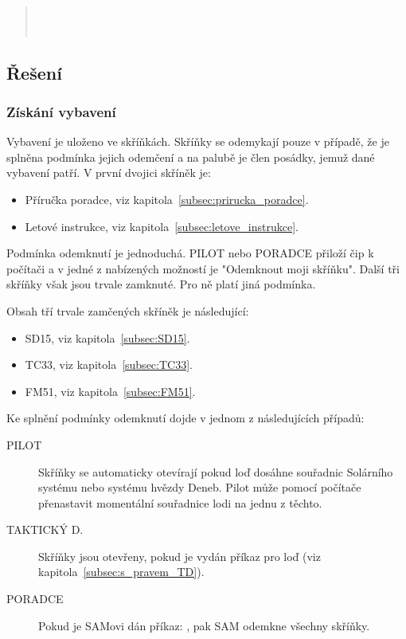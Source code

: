 \documentclass[11pt,oneside,a4paper]{article}
\begin{document}
\begin{quote}
 \\
 \\
\end{quote}

\subsection{\texorpdfstring{Řešení}{Reseni}}
\subsubsection{\texorpdfstring{Získání vybavení}{Ziskani vybaveni}}
\label{subsubsec:ziskani_vybaveni}
Vybavení je uloženo ve skříňkách. Skříňky se odemykají pouze v případě, že je splněna podmínka jejich odemčení a na palubě je člen posádky, jemuž dané vybavení patří. V první dvojici skříněk je:

\begin{itemize}
\item Příručka poradce, viz kapitola~\ref{subsec:prirucka_poradce}.
\item Letové instrukce, viz kapitola~\ref{subsec:letove_instrukce}.
\end{itemize}

Podmínka odemknutí je jednoduchá. PILOT nebo PORADCE přiloží čip k počítači a v jedné z nabízených možností je "Odemknout moji skříňku". Další tři skříňky však jsou trvale zamknuté. Pro ně platí jiná podmínka.

Obsah tří trvale zamčených skříněk je následující:

\begin{itemize}
\item SD15, viz kapitola~\ref{subsec:SD15}.
\item TC33, viz kapitola~\ref{subsec:TC33}.
\item FM51, viz kapitola~\ref{subsec:FM51}.
\end{itemize}

Ke splnění podmínky odemknutí dojde v jednom z následujících případů:
\begin{description}
\item[PILOT] Skříňky se automaticky otevírají pokud loď dosáhne souřadnic Solárního systému nebo systému hvězdy Deneb. Pilot může pomocí počítače přenastavit momentální souřadnice lodi na jednu z těchto.
\item[TAKTICKÝ D.] Skříňky jsou otevřeny, pokud je vydán příkaz pro loď  (viz kapitola~\ref{subsec:s_pravem_TD}).
\item[PORADCE] Pokud je SAMovi dán příkaz: , pak SAM odemkne všechny skříňky.
\end{description}
\end{document}
